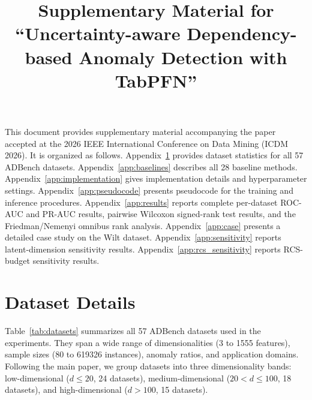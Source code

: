 \documentclass[conference]{IEEEtran}
\begin{document}
	\title{Supplementary Material for ``Uncertainty-aware Dependency-based Anomaly Detection with TabPFN''}

	\author{
		}

	\maketitle

	\noindent This document provides supplementary material accompanying the paper accepted at the 2026 IEEE International Conference on Data Mining (ICDM 2026).
	It is organized as follows.
	Appendix~\ref{app:datasets} provides dataset statistics for all 57 ADBench datasets.
	Appendix~\ref{app:baselines} describes all 28 baseline methods.
	Appendix~\ref{app:implementation} gives implementation details and hyperparameter settings.
	Appendix~\ref{app:pseudocode} presents pseudocode for the training and inference procedures.
	Appendix~\ref{app:results} reports complete per-dataset ROC-AUC and PR-AUC results, pairwise Wilcoxon signed-rank test results, and the Friedman/Nemenyi omnibus rank analysis.
	Appendix~\ref{app:case} presents a detailed case study on the Wilt dataset.
	Appendix~\ref{app:sensitivity} reports latent-dimension sensitivity results.
	Appendix~\ref{app:rcs_sensitivity} reports RCS-budget sensitivity results.

	\appendices

	\section{Dataset Details}
	\label{app:datasets}
	Table~\ref{tab:datasets} summarizes all 57 ADBench datasets used in the experiments. They span a wide range of dimensionalities (3 to 1555 features), sample sizes (80 to 619326 instances), anomaly ratios, and application domains. Following the main paper, we group datasets into three dimensionality bands: low-dimensional ($d \leq 20$, 24 datasets), medium-dimensional ($20 < d \leq 100$, 18 datasets), and high-dimensional ($d > 100$, 15 datasets).
\end{document}
